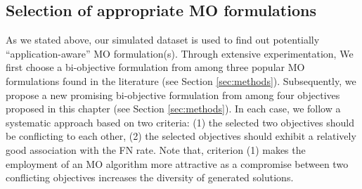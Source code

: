 \subsection{Selection of appropriate MO formulations}
\label{sec:selection_msa_formulation}
As we stated above, our simulated dataset is used to find out potentially ``application-aware'' MO formulation(s). Through extensive experimentation, We first choose a bi-objective formulation from among three popular MO formulations found in the literature (see Section \ref{sec:methods}). Subsequently, we propose a new promising bi-objective formulation from among four objectives proposed in this chapter (see Section \ref{sec:methods}). In each case, we follow a systematic approach based on two criteria: (1) the selected two objectives should be conflicting to each other, (2) the selected objectives should exhibit a relatively good association with the FN rate. Note that, criterion (1) makes the employment of an MO algorithm more attractive as a compromise between two conflicting objectives increases the diversity of generated solutions. 
